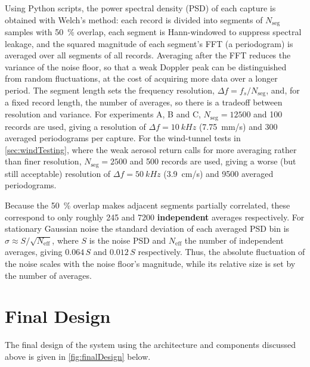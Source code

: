  Using Python scripts, the power spectral density (PSD) of each capture is obtained with Welch's method: each record is divided into segments of $N_{\mathrm{seg}}$ samples with \SI{50}{\percent} overlap, each segment is Hann-windowed to suppress spectral leakage, and the squared magnitude of each segment's FFT (a periodogram) is averaged over all segments of all records. Averaging after the FFT reduces the variance of the noise floor, so that a weak Doppler peak can be distinguished from random fluctuations, at the cost of acquiring more data over a longer period. The segment length sets the frequency resolution, $\Delta f = f_s/N_{\mathrm{seg}}$, and, for a fixed record length, the number of averages, so there is a tradeoff between resolution and variance. For experiments A, B and C, $N_{\mathrm{seg}} = \num{12500}$ and 100 records are used, giving a resolution of $\Delta f = \SI{10}{kHz}$ (\SI{7.75}{mm/s}) and 300 averaged periodograms per capture. For the wind-tunnel tests in \autoref{sec:windTesting}, where the weak aerosol return calls for more averaging rather than finer resolution, $N_{\mathrm{seg}} = \num{2500}$ and 500 records are used, giving a worse (but still acceptable) resolution of $\Delta f = \SI{50}{kHz}$ (\SI{3.9}{cm/s}) and \num{9500} averaged periodograms.
 
 Because the \SI{50}{\percent} overlap makes adjacent segments partially correlated, these correspond to only roughly 245 and \num{7200} \textbf{independent} averages respectively. For stationary Gaussian noise the standard deviation of each averaged PSD bin is $\sigma \approx S/\sqrt{N_{\mathrm{eff}}}$, where $S$ is the noise PSD and $N_{\mathrm{eff}}$ the number of independent averages, giving $0.064\,S$ and $0.012\,S$ respectively. Thus, the absolute fluctuation of the noise scales with the noise floor's magnitude, while its relative size is set by the number of averages.
 
\section{Final Design}
The final design of the system using the architecture and components discussed above is given in \autoref{fig:finalDesign} below.

